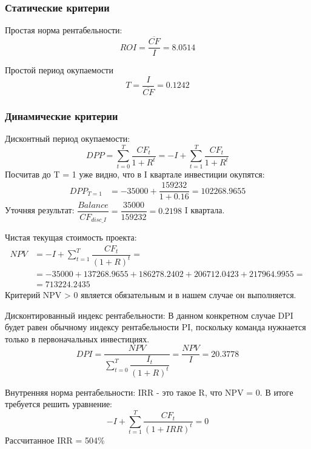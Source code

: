 	\subsubsection{Статические критерии}
	Простая норма рентабельности:
	\begin{equation}
	ROI = \dfrac{\overline{CF}}{I} = 8.0514
	\end{equation}
	
	Простой период окупаемости
	\begin{equation}
	T = \dfrac{I}{\overline{CF}} = 0.1242
	\end{equation}
	
	\subsubsection{Динамические критерии}
	Дисконтный период окупаемости:
	\begin{equation}
	DPP = \sum_{t = 0}^{T} \dfrac{CF_t}{1 + R^t} = -I + \sum_{t = 1}^{T} \dfrac{CF_t}{1 + R^t}
	\end{equation}
	Посчитав до T = 1 уже видно, что в I квартале инвестиции окупятся:
	\begin{equation}
	\begin{aligned}
	DPP_{T = 1} &= -35000 + \dfrac{159232}{1 + 0.16} = 102268.9655
	\end{aligned}				
	\end{equation} 
	Уточняя результат: $\dfrac{Balance}{CF_{disc\_I}} = \dfrac{35000}{159232} = 0.2198$ I квартала.
	
	Чистая текущая стоимость проекта:
	\begin{equation}
	\begin{aligned}
	NPV &= -I + \sum_{t = 1}^{T} \dfrac{CF_t}{(1 + R)^t} =\\
	&= -35000 + 137268.9655 + 186278.2402 + 206712.0423 + 217964.9955 =\\ 
	&= 713224.2435
	\end{aligned}
	\end{equation}	
	Критерий NPV > 0 является обязательным и в нашем случае он выполняется.
	
	Дисконтированный индекс рентабельности:
	В данном конкретном случае DPI будет равен обычному индексу рентабельности PI, поскольку команда нужнается только в первоначальных инвестициях.
	\begin{equation}
	DPI = \dfrac{NPV}{\sum_{t = 0}^{T} \dfrac{I_t}{(1 + R)^t}} = \dfrac{NPV}{I} = 20.3778
	\end{equation}
	
	Внутренняя норма рентабельности:
	IRR - это такое R, что NPV = 0. В итоге требуется решить уравнение:
	\begin{equation}
	-I + \sum_{t = 1}^{T} \dfrac{CF_t}{(1 + IRR)^t} = 0
	\end{equation}	
	Рассчитанное IRR = 504\%
